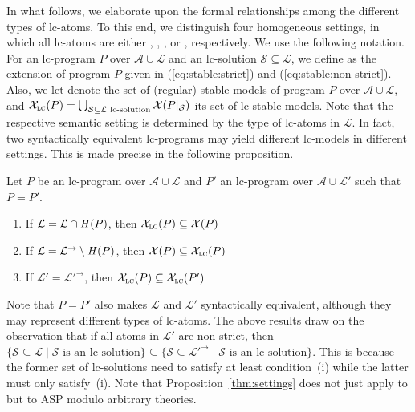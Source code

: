 
In what follows,
we elaborate upon the formal relationships among the different types of lc-atoms.
To this end,
we distinguish four homogeneous settings, in which all lc-atoms are either
,
,
, or
, respectively.
We use the following notation.
For an lc-program $P$ over $\mathcal{A}\cup\mathcal{L}$ and an lc-solution $\mathcal{S}\subseteq\mathcal{L}$,
we define  as the extension of program $P$ given in (\ref{eq:stable:strict}) and (\ref{eq:stable:non-strict}).
Also,
we let  denote the set of (regular) stable models of program $P$ over $\mathcal{A}\cup\mathcal{L}$,
and
\(
\mathcal{X}_{\textsc{lc}}(P)=
\bigcup_{\mathcal{S}\subseteq\mathcal{L}\text{ lc-solution}}
\mathcal{X}(P|_{\mathcal{S}})
\)
its set of lc-stable models.
Note that the respective semantic setting is determined by the type of lc-atoms in $\mathcal{L}$.
In fact, two syntactically equivalent lc-programs may yield different lc-models in different settings.
%
This is made precise in the following proposition.
\begin{theorem}\label{thm:settings}
  Let $P$ be an lc-program over $\mathcal{A}\cup\mathcal{L}$
  and $P'$   an lc-program over $\mathcal{A}\cup\mathcal{L}'$
  such that $P=P'$.
  \begin{enumerate}
  \item \label{th:dsr} %
    If
    \(
    \mathcal{L}=\mathcal{L}\cap\mathit{H}(P)
    \),
    then
    \(
    \mathcal{X}_{\textsc{lc}}(P)\subseteq\mathcal{X}(P)
    \)
  \item \label{th:rsen} %
    If
    \(
    \mathcal{L}=\mathcal{L}^\rightarrow\setminus\mathit{H}(P)
    \),
    then
    \(
    \mathcal{X}(P)\subseteq\mathcal{X}_{\textsc{lc}}(P)
    \)
  \item \label{th:ssn} %
    If
    \(
    \mathcal{L}'=\mathcal{L}'^\rightarrow
    \),
    then
    \(
    \mathcal{X}_{\textsc{lc}}(P)\subseteq\mathcal{X}_{\textsc{lc}}(P')
    \)
  \end{enumerate}
\end{theorem}
%
Note that $P=P'$ also makes $\mathcal{L}$ and $\mathcal{L}'$ syntactically equivalent,
although they may represent different types of lc-atoms.
%
The above results draw on the observation that if all atoms in $\mathcal{L}'$ are non-strict, then
\(
\{\mathcal{S}\subseteq\mathcal{L} \mid \mathcal{S}\text{ is an lc-solution}\}
\subseteq
\{\mathcal{S}\subseteq\mathcal{L}'^\rightarrow \mid \mathcal{S}\text{ is an lc-solution}\}
\).
This is because the former set of lc-solutions need to satisfy at least condition~(i)
while the latter must only satisfy~(i).
%
Note that Proposition~\ref{thm:settings} does not just apply to  but to ASP modulo arbitrary theories.

